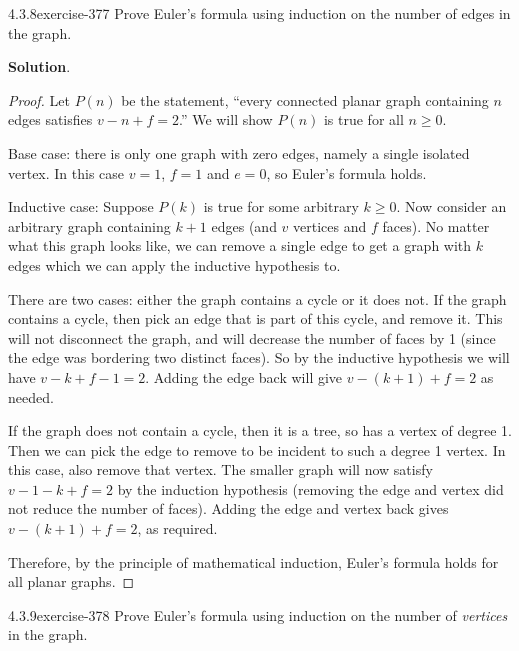 \documentclass[twoside,11pt,]{book}
\numberwithin{equation}{chapter}
\begin{document}
\begin{divisionsolution}{4.3.8}{}{exercise-377}%
\hypertarget{p-4701}{}%
Prove Euler's formula using induction on the number of edges in the graph.%
\par\smallskip%
\noindent\textbf{Solution}.\quad%
\begin{proof}{}
\hypertarget{p-4702}{}%
Let \(P(n)\) be the statement, ``every connected planar graph containing \(n\) edges satisfies \(v - n + f = 2\).'' We will show \(P(n)\) is true for all \(n \ge 0\).%
\par
\hypertarget{p-4703}{}%
Base case: there is only one graph with zero edges, namely a single isolated vertex. In this case \(v = 1\), \(f = 1\) and \(e = 0\), so Euler's formula holds.%
\par
\hypertarget{p-4704}{}%
Inductive case: Suppose \(P(k)\) is true for some arbitrary \(k \ge 0\). Now consider an arbitrary graph containing \(k+1\) edges (and \(v\) vertices and \(f\) faces). No matter what this graph looks like, we can remove a single edge to get a graph with \(k\) edges which we can apply the inductive hypothesis to.%
\par
\hypertarget{p-4705}{}%
There are two cases: either the graph contains a cycle or it does not. If the graph contains a cycle, then pick an edge that is part of this cycle, and remove it.  This will not disconnect the graph, and will decrease the number of faces by 1 (since the edge was bordering two distinct faces).  So by the inductive hypothesis we will have \(v - k + f-1 = 2\). Adding the edge back will give \(v - (k+1) + f = 2\) as needed.%
\par
\hypertarget{p-4706}{}%
If the graph does not contain a cycle, then it is a tree, so has a vertex of degree 1.  Then we can pick the edge to remove to be incident to such a degree 1 vertex. In this case, also remove that vertex. The smaller graph will now satisfy \(v-1 - k + f = 2\) by the induction hypothesis (removing the edge and vertex did not reduce the number of faces). Adding the edge and vertex back gives \(v - (k+1) + f = 2\), as required.%
\par
\hypertarget{p-4707}{}%
Therefore, by the principle of mathematical induction, Euler's formula holds for all planar graphs.%
\end{proof}
\end{divisionsolution}%
\begin{divisionsolution}{4.3.9}{}{exercise-378}%
\hypertarget{p-4708}{}%
Prove Euler's formula using induction on the number of \emph{vertices} in the graph.%
\end{divisionsolution}%
\end{document}
